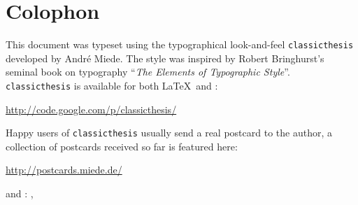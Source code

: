 \thispagestyle{empty}

\hfill

\vfill

\section*{Colophon}
This document was typeset using the typographical look-and-feel
\texttt{classicthesis} developed by Andr\'e Miede.
The style was inspired by Robert Bringhurst's seminal book on
typography ``\emph{The Elements of Typographic Style}''.
\texttt{classicthesis} is available for both \LaTeX\ and \mLyX: 
\begin{center}
\url{http://code.google.com/p/classicthesis/}
\end{center}
Happy users of \texttt{classicthesis} usually send a real postcard
to the author, a collection of postcards received so far is
featured here:
\begin{center}
\url{http://postcards.miede.de/}
\end{center}
 
\bigskip

\noindent\myFirstAuthorName and \mySecondAuthorName:
\textit{\myTitle},
\myTime

\medskip

\noindent\finalVersionString